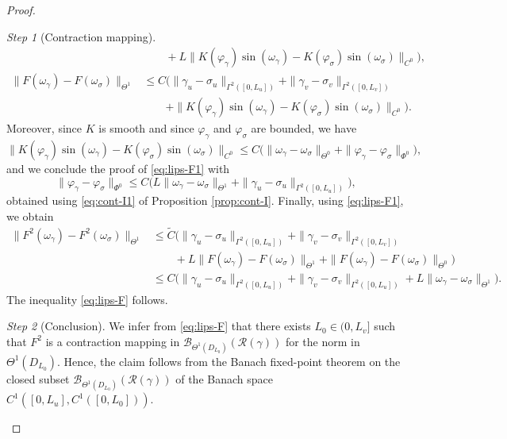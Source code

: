 \documentclass{article}
\newcommand{\RR}{\mathcal{R}}
\theoremstyle{remark}
\theoremstyle{prpart}
\newtheorem{proofpart}{Step}
\newcommand{\B}{\mathcal{B}}
\begin{document}
\begin{proof}
\begin{proofpart}[Contraction mapping]
\begin{align*}
  &\qquad+ L\|K(\varphi_\gamma)\sin(\omega_\gamma) - K(\varphi_\sigma)\sin(\omega_\sigma)\|_{C^0}\Big),\\
\|F(\omega_\gamma)-F(\omega_\sigma)\|_{\Theta^1} &\leq C \Big(\|\gamma_u-\sigma_u\|_{\Gamma^2([0,L_u])} + \|\gamma_v-\sigma_v\|_{\Gamma^2([0,L_v])} \\
  &\qquad+ \|K(\varphi_\gamma)\sin(\omega_\gamma) - K(\varphi_\sigma)\sin(\omega_\sigma)\|_{C^0}\Big).
\end{align*}
Moreover, since $K$ is smooth and since $\varphi_\gamma$ and $\varphi_\sigma$ are bounded, we have
\begin{equation*}
  \|K(\varphi_\gamma)\sin(\omega_\gamma) - K(\varphi_\sigma)\sin(\omega_\sigma)\|_{C^0} \leq C\Big( \|\omega_\gamma - \omega_\sigma\|_{\Theta^0} + \|\varphi_\gamma - \varphi_\sigma\|_{\Phi^0}\Big),
\end{equation*}
and we conclude the proof of \eqref{eq:lips-F1} with
  \begin{equation}\label{eq:pr-pt-fix}
    \|\varphi_\gamma - \varphi_\sigma\|_{\Phi^0} \leq C\Big(L\|\omega_\gamma-\omega_\sigma\|_{\Theta^1} + \|\gamma_u-\sigma_u\|_{\Gamma^2([0,L_u])}\Big),%
  \end{equation}
obtained using \eqref{eq:cont-I1} of Proposition \ref{prop:cont-I}. Finally, using \eqref{eq:lips-F1}, we obtain
\begin{align*}
\|F^2(\omega_\gamma)-F^2(\omega_\sigma)\|_{\Theta^1}
&\leq \tilde C\Big(\|\gamma_u-\sigma_u\|_{\Gamma^2([0,L_u])} + \|\gamma_v-\sigma_v\|_{\Gamma^2([0,L_v])} \\
&\qquad+ L\|F(\omega_\gamma)-F(\omega_\sigma)\|_{\Theta^1}+ \|F(\omega_\gamma)-F(\omega_\sigma)\|_{\Theta^0}\Big)\\
&\leq C\Big(\|\gamma_u-\sigma_u\|_{\Gamma^2([0,L_u])} + \|\gamma_v-\sigma_v\|_{\Gamma^2([0,L_u])} + L\|\omega_\gamma-\omega_\sigma\|_{\Theta^1}\Big).
\end{align*}
The inequality \eqref{eq:lips-F} follows.
\end{proofpart}
\begin{proofpart}[Conclusion]\label{step:ccl-fixed-point}
We infer from \eqref{eq:lips-F} that there exists $L_0\in(0,L_v]$ such that $F^2$ is a contraction mapping in $\B_{\Theta^1(D_{L_0})}(\RR(\gamma))$ for the norm in $\Theta^1(D_{L_0})$.
Hence, the claim follows from the Banach fixed-point theorem on the closed subset $\B_{\Theta^1(D_{L_0})}(\RR(\gamma))$ of the Banach space $C^1([0,L_u],C^1([0,L_0]))$.
\end{proofpart}
\end{proof}
\end{document}
